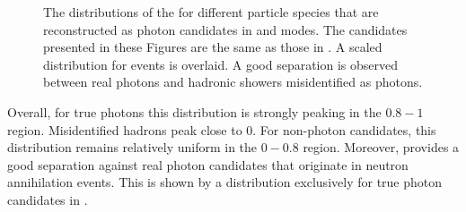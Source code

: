 \begin{figure}[hbtp!]
    \centering
    \caption{\label{fig:zmva_distribution} The distributions of the \ZMVA for different particle species that are reconstructed as photon candidates in \feiBp and \feiBz modes.
    The candidates presented in these Figures are the same as those in .
    A scaled \ZMVA distribution for \BtoXsgamma events is overlaid.
    A good separation is observed between real photons and hadronic showers misidentified as photons.}
\end{figure}

Overall, for true photons this distribution is strongly peaking in the $0.8-1$ region.
Misidentified hadrons peak close to 0.
For non-\BtoXsgamma photon candidates, this distribution remains relatively uniform in the $0-0.8$ region.
Moreover, \ZMVA provides a good separation against real photon candidates that originate in neutron annihilation events.
This is shown by a \ZMVA distribution exclusively for true photon candidates in .

